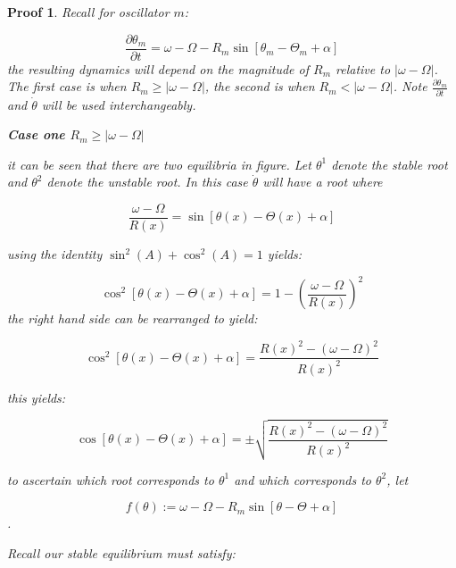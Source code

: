 \documentclass{article}
\newtheorem{pf}{Proof}[section]
\begin{document}
\begin{pf}
Recall for oscillator $m$:

$$\frac{\partial \theta_m}{\partial t} = \omega - \Omega - R_m \sin[\theta_m - \Theta_m + \alpha]$$
\noindent
the resulting dynamics will depend on the magnitude of $R_m$ relative to $|\omega - \Omega|$. The first case is when $R_m \geq |\omega - \Omega|$, the second is when $R_m < |\omega - \Omega|$. Note $\frac{\partial \theta_m}{\partial t}$ and $\dot{\theta}$ will be used interchangeably.

\textbf{Case one $R_m \geq |\omega - \Omega|$}

\vspace{1 cm}
\begin{figure}[H]
\end{figure}
it can be seen that there are two equilibria in figure. Let $\theta^1$ denote the stable root and $\theta^2$ denote the unstable root. In this case $\dot{\theta}$ will have a root where

$$ \frac{\omega - \Omega}{R(x)} = \sin[\theta(x) - \Theta(x) + \alpha] $$

using the identity $\sin^2(A) + \cos^2(A) = 1$ yields:

$$\cos^2[\theta(x) - \Theta(x) + \alpha] = 1- \displaystyle(\frac{\omega - \Omega}{R(x)})^2 $$
the right hand side can be rearranged to yield:

$$\cos^2[\theta(x) - \Theta(x) + \alpha] =  \frac{R(x)^2-(\omega-\Omega)^2}{R(x)^2}$$

this yields:

$$\cos[\theta(x) - \Theta(x) + \alpha] =  \pm \sqrt{\frac{R(x)^2-(\omega-\Omega)^2}{R(x)^2}} $$

to ascertain which root corresponds to $\theta^1$ and which corresponds to $\theta^2$, let

$$f(\theta) := \omega - \Omega - R_m \sin[\theta - \Theta + \alpha]$$.

Recall our stable equilibrium must satisfy:


\end{pf}
\end{document}
